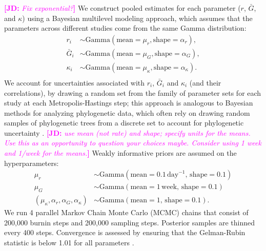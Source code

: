\documentclass[12pt]{article}
\newcommand{\comment}[3]{\textcolor{#1}{\textbf{[#2: }\textsl{#3}\textbf{]}}}
\newcommand{\jd}[1]{\comment{magenta}{JD}{#1}}
\begin{document}
\jd{Fix exponential?}
We construct pooled estimates for each parameter ($r$, $\bar G$, and $\kappa$) using a Bayesian multilevel modeling approach, which assumes that the parameters across different studies come from the same Gamma distribution:
\begin{equation}
\begin{aligned}
r_i &\sim \mathrm{Gamma}(\mathrm{mean}=\mu_r, \mathrm{shape}=\alpha_r),\\
\bar{G}_i &\sim \mathrm{Gamma}(\mathrm{mean}=\mu_G, \mathrm{shape}=\alpha_G),\\
\kappa_i &\sim \mathrm{Gamma}(\mathrm{mean}=\mu_\kappa, \mathrm{shape}=\alpha_\kappa).\\
\end{aligned}
\end{equation}
We account for uncertainties associated with $r_i$, $\bar G_i$ and $\kappa_i$ (and their correlations), by drawing a random set from the family of parameter sets for each study at each Metropolis-Hastings step;
this approach is analogous to Bayesian methods for analyzing phylogenetic data, which often rely on drawing random samples of phylogenetic trees from a discrete set to account for phylogenetic uncertainty \citep{pagel2004bayesian,bedford2014integrating}.
\jd{use mean (not rate) and shape; specify units for the means. Use this as an opportunity to question your choices maybe. Consider using 1 week and 1/week for the means.}
Weakly informative priors are assumed on the hyperparameters:
\begin{equation}
\begin{aligned}
\mu_r &\sim \mathrm{Gamma}(\mathrm{mean}=0.1\,\mathrm{day}^{-1},\,\mathrm{shape}=0.1)\\
\mu_G &\sim \mathrm{Gamma}(\mathrm{mean}=1\,\mathrm{week},\,\mathrm{shape}=0.1)\\
(\mu_\kappa, \alpha_r, \alpha_G, \alpha_\kappa) &\sim \mathrm{Gamma}(\mathrm{mean}=1,\,\mathrm{shape}=0.1).
\end{aligned}
\end{equation}
We run 4 parallel Markov Chain Monte Carlo (MCMC) chains that consist of 200,000 burnin steps and 200,000 sampling steps.
Posterior samples are thinned every 400 steps.
Convergence is assessed by ensuring that the Gelman-Rubin statistic is below 1.01 for all parameters \citep{gelman1992inference}.


\pagebreak


\end{document}
